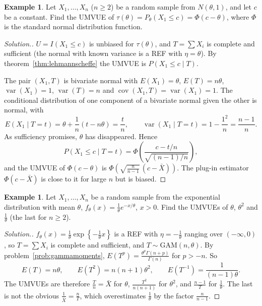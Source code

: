 \documentclass[12pt,a4paper]{report}
\theoremstyle{definition}
\newtheorem{exa}[thm]{Example}
\DeclareMathOperator{\var}{var}
\DeclareMathOperator{\cov}{cov}
\newenvironment{solution}
  {\renewcommand{\qedsymbol}{}\begin{proof}[\textit{Solution}.]}
  {\end{proof}}
\begin{document}
\begin{exa}
\label{ex:normalcdf}
Let $X_1, \dots, X_n$ ($n\ge 2$) be a random sample from $N(\theta, 1)$, and let $c$
be a constant. Find the UMVUE of $\tau(\theta) = P_\theta(X_1\le c) = \Phi(c - \theta)$,
where $\Phi$ is the standard normal distribution function.
\end{exa}

\begin{solution}
$U = I(X_1\le c)$ is unbiased for $\tau(\theta)$, and $T = \sum X_i$ is complete
and sufficient (the normal with known variance is a REF with $\eta = \theta$). By
theorem~\ref{thm:lehmannscheffe} the UMVUE is $P(X_1\le c\mid T)$.

The pair $(X_1, T)$ is bivariate normal with $E(X_1) = \theta$, $E(T) = n\theta$,
$\var(X_1) = 1$, $\var(T) = n$ and $\cov(X_1, T) = \var(X_1) = 1$. The conditional
distribution of one component of a bivariate normal given the other is normal,
with
\[E(X_1\mid T = t) = \theta + \frac{1}{n}(t - n\theta) = \frac tn,\qquad
\var(X_1\mid T = t) = 1 - \frac{1^2}{n} = \frac{n - 1}{n} .\]
As sufficiency promises, $\theta$ has disappeared. Hence
\[P(X_1\le c\mid T = t) = \Phi\left(\frac{c - t/n}{\sqrt{(n - 1)/n}}\right),\]
and the UMVUE of $\Phi(c - \theta)$ is $\Phi\left(\sqrt{\frac{n}{n - 1}}\,(c - \bar X)\right)$.
The plug-in estimator $\Phi(c - \bar X)$ is close to it for large $n$ but is
biased.
\end{solution}

\begin{exa}
\label{ex:exponentialumvue}
Let $X_1, \dots, X_n$ be a random sample from the exponential distribution with
mean $\theta$, $f_\theta(x) = \frac1\theta e^{-x/\theta}$, $x>0$. Find the UMVUEs of
$\theta$, $\theta^2$ and $\frac1\theta$ (the last for $n\ge 2$).
\end{exa}

\begin{solution}
$f_\theta(x) = \frac1\theta\exp\left\{-\frac1\theta x\right\}$ is a REF with
$\eta = -\frac1\theta$ ranging over $(-\infty, 0)$, so $T = \sum X_i$ is complete and
sufficient, and $T\sim\text{GAM}(n, \theta)$. By problem~\ref{prob:gammamoments},
$E(T^p) = \frac{\theta^p\Gamma(n + p)}{\Gamma(n)}$ for $p>-n$. So
\[E(T) = n\theta,\qquad E(T^2) = n(n + 1)\theta^2,\qquad E(T^{-1}) = \frac{1}{(n - 1)\theta} .\]
The UMVUEs are therefore $\frac Tn = \bar X$ for $\theta$, $\frac{T^2}{n(n + 1)}$ for
$\theta^2$, and $\frac{n - 1}{T}$ for $\frac1\theta$. The last is not the obvious
$\frac{1}{\bar X} = \frac nT$, which overestimates $\frac1\theta$ by the factor
$\frac{n}{n - 1}$.
\end{solution}
\end{document}
